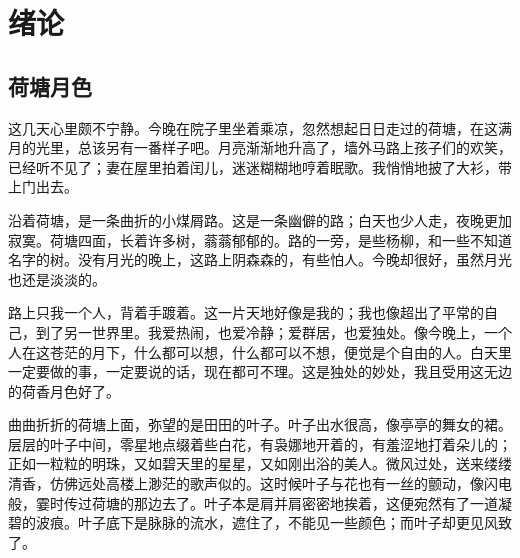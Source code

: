\chapter{绪论}
\section{荷塘月色}
这几天心里颇不宁静\citep{刘少奇1962论共产党员的修养}。今晚在院子里坐着乘凉\citep{黄蕴慧1982国际矿物学研究的动向}，忽然想起日日走过的荷塘\citep{张筑生1983微分半动力系统的不变集}，在这满月的光里\citep{中国科学院南京土壌研究所1977我国西沙群岛的土壤和鸟粪磷矿}，总该另有一番样子吧。月亮渐渐地升高了，墙外马路上孩子们的欢笑，已经听不见了；妻在屋里拍着闰儿，迷迷糊糊地哼着眠歌。我悄悄地披了大衫，带上门出去。

沿着荷塘\citep{李四光1973地壳构造与地壳运动,何龄修1998读顾城,金显贺1993一种用于在线检测局部放电的数字滤波技术,辛希孟1994信息技术与信息服务国际研讨会论文集}，是一条曲折的小煤屑路\citep{钟文发1996非线性规划在可燃毒物配置中的应用}。这是一条幽僻的路；白天也少人走，夜晚更加寂寞。荷塘四面，长着许多树，蓊蓊郁郁的。路的一旁，是些杨柳，和一些不知道名字的树。没有月光的晚上，这路上阴森森的，有些怕人。今晚却很好，虽然月光也还是淡淡的。

路上只我一个人\citep{谢希德1998创造学习的新思路}，背着手踱着\citep{19961996汉语拼音正词法基本规则}。这一片天地好像是我的；我也像超出了平常的自己，到了另一世界里。我爱热闹，也爱冷静；爱群居，也爱独处。像今晚上，一个人在这苍茫的月下，什么都可以想，什么都可以不想，便觉是个自由的人。白天里一定要做的事，一定要说的话，现在都可不理。这是独处的妙处，我且受用这无边的荷香月色好了。

曲曲折折的荷塘上面\citep{姜锡洲1989一种温热外敷药的制备方法,王明亮1998关于中国学术期刊标准化数据库系统工程的进展,万锦坤1996中国大学学报论文文摘}，弥望的是田田的叶子。叶子出水很高，像亭亭的舞女的裙。层层的叶子中间，零星地点缀着些白花，有袅娜地开着的，有羞涩地打着朵儿的；正如一粒粒的明珠，又如碧天里的星星，又如刚出浴的美人。微风过处，送来缕缕清香，仿佛远处高楼上渺茫的歌声似的。这时候叶子与花也有一丝的颤动，像闪电般，霎时传过荷塘的那边去了。叶子本是肩并肩密密地挨着，这便宛然有了一道凝碧的波痕。叶子底下是脉脉的流水，遮住了，不能见一些颜色；而叶子却更见风致了。
